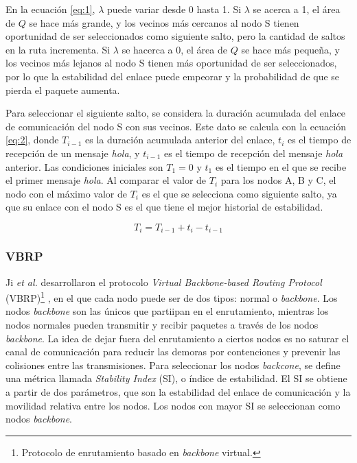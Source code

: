 
En la ecuación \ref{eq:1}, $\lambda$ puede variar desde 0 hasta 1. Si $\lambda$ se
acerca a 1, el área de $Q$ se hace más grande, y los vecinos más cercanos al nodo S
tienen oportunidad de ser seleccionados como siguiente salto, pero la cantidad
de saltos en la ruta incrementa. Si $\lambda$ se hacerca a 0, el área de $Q$ se
hace más pequeña, y los vecinos más lejanos al nodo S tienen más oportunidad
de ser seleccionados, por lo que la estabilidad del enlace puede empeorar
y la probabilidad de que se pierda el paquete aumenta.

Para seleccionar el siguiente salto, se considera la duración acumulada del
enlace de comunicación del nodo S con sus vecinos. Este dato se calcula con la
ecuación \ref{eq:2}, donde $T_{i-1}$ es la duración acumulada anterior del
enlace, $t_i$ es el tiempo de recepción de un mensaje \textit{hola}, y $t_{i-1}$
es el tiempo de recepción del mensaje \textit{hola} anterior. Las condiciones
iniciales son $T_1 = 0$ y $t_1$ es el tiempo en el que se recibe el primer
mensaje \textit{hola}. Al comparar el valor de $T_i$ para los nodos A, B y C,
el nodo con el máximo valor de $T_i$ es el que se selecciona como siguiente
salto, ya que su enlace con el nodo S es el que tiene el mejor historial de
estabilidad.

\begin{equation}
\label{eq:2}
T_i = T_{i-1} + t_i - t_{i-1}
\end{equation}

\subsubsection{VBRP}

\label{subsubsec:vbpr}

Ji \textit{et al.} desarrollaron el protocolo \textit{Virtual Backbone-based
Routing Protocol} (VBRP)\footnote{Protocolo de enrutamiento basado en
\textit{backbone} virtual.} \cite{Ji2019}, en el que cada nodo puede ser de dos
tipos: normal o \textit{backbone}. Los nodos \textit{backbone} son las únicos
que partiipan en el enrutamiento, mientras los nodos normales pueden transmitir
y recibir paquetes a través de los nodos \textit{backbone}. La idea de dejar
fuera del enrutamiento a ciertos nodos es no saturar el canal de comunicación
para reducir las demoras por contenciones y prevenir las colisiones entre las
transmisiones. Para seleccionar los nodos \textit{backcone}, se define una
métrica llamada \textit{Stability Index} (SI), o índice de estabilidad. El SI
se obtiene a partir de dos parámetros, que son la estabilidad del enlace de
comunicación y la movilidad relativa entre los nodos. Los nodos con mayor SI se
seleccionan como nodos \textit{backbone}.

